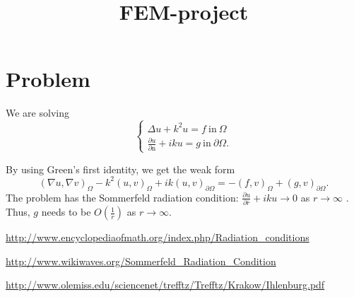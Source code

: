 \documentclass[a4paper,12pt]{article}
\begin{document}
\title{FEM-project}
\author{}
\date{}
\maketitle
\section*{Problem}
We are solving \[ \begin{cases}
\Delta u + k^2 u = f \ \mathrm{in} \ \Omega \\ \frac{\partial u}{\partial \mathrm{n}} + iku = g \ \mathrm{in} \ \partial \Omega.
\end{cases} \]

By using Green's first identity, we get the weak form \begin{equation*}
(\nabla u, \nabla v)_{\Omega} - k^2(u, v)_{\Omega} + ik(u, v)_{\partial \Omega} = -(f, v)_{\Omega} + (g, v)_{\partial \Omega}.
\end{equation*} The problem has the Sommerfeld radiation condition: $\frac{\partial u}{\partial \bar{r}} + iku \rightarrow 0$ as $r \rightarrow \infty$ \cite{eom} \cite{wikiwaves}. Thus, $g$ needs to be $O(\frac{1}{r})$ as $r \rightarrow \infty$.



\begin{thebibliography}{9}

\url{http://www.encyclopediaofmath.org/index.php/Radiation_conditions}

\url{http://www.wikiwaves.org/Sommerfeld_Radiation_Condition}

\url{http://www.olemiss.edu/sciencenet/trefftz/Trefftz/Krakow/Ihlenburg.pdf}

\end{thebibliography}
\end{document}
